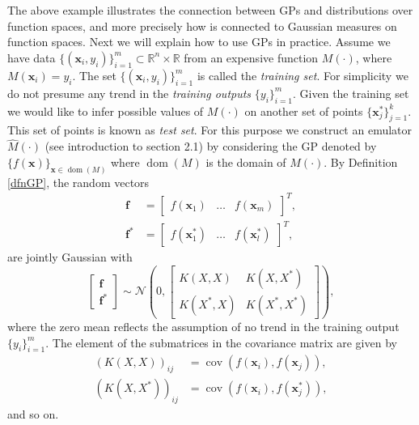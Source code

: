 \documentclass[12pt]{book}
\newcommand{\x}{\textbf{x}}
\DeclareMathOperator*{\cov}{cov}
\DeclareMathOperator{\dom}{dom}
\begin{document}
The above example illustrates the connection between GPs and distributions over function spaces, and more
precisely how  is connected to Gaussian measures on function spaces. Next we will
explain how to use GPs in practice.
\newline
Assume  we have  data $\{(\textbf{x}_{i},y_{i})\}_{i=1}^{m}\subset\mathbb{R}^{n}\times\mathbb{R}$ 
 from an expensive function  $M(\cdot)$,
where $M(\textbf{x}_{i})=y_{i}$. The set $\{(\textbf{x}_{i},y_{i})\}_{i=1}^{m}$ is called
the \textit{training set}. For
simplicity we do not presume any trend in the \textit{training outputs} $\{y_{i}\}_{i=1}^{m}$. Given the training set
we would like to infer  possible values of $M(\cdot)$ on another set of points 
$\{\textbf{x}_{j}^{*}\}_{j=1}^{k}$. This set of points  is known as \textit{test set}.
For this purpose we construct an emulator $\widehat{M}(\cdot)$ (see introduction to section 2.1) by
considering the GP denoted by $\{f(\textbf{x})\}_{\x\in\dom(M)}$
 where $\dom(M)$ 
is  the domain of $M(\cdot)$.
 By
Definition \ref{dfnGP}, the random vectors
\begin{align*}
\textbf{f}&=\begin{bmatrix}f(\textbf{x}_{1}) & \ldots & f(\textbf{x}_{m}) \end{bmatrix}^{T}, \\
\textbf{f}^{*}&=\begin{bmatrix}f(\textbf{x}_{1}^{*}) & \ldots & f(\textbf{x}_{l}^{*}) \end{bmatrix}^{T},
\end{align*}
are  jointly Gaussian with
\begin{equation}\label{eqnconditional}
\begin{bmatrix}
\textbf{f} \\
\textbf{f}^{*}
\end{bmatrix}\sim\mathscr{N}\left(0,\begin{bmatrix} K(X,X) & K(X,X^{*}) \\
						    K(X^{*},X) & K(X^{*},X^{*}) \end{bmatrix}
\right),
\end{equation}	
where the zero mean reflects the assumption of no  trend in the training output $\{y_{i}\}_{i=1}^{m}$.
The element of the submatrices in the covariance matrix are given by
\begin{align*}
(K(X,X))_{ij}&=\cov(f(\x_{i}),f(\x_{j})),\\ 
(K(X,X^{*}))_{ij}&=\cov(f(\textbf{x}_{i}),f(\x_{j}^{*})),
\end{align*}
and so on.
\end{document}
